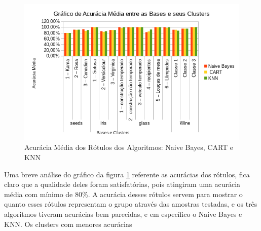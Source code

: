 \begin{figure}[h!]
        \centering
        \includegraphics[scale=0.9]{figs/grafico_acuracia_media_algoritmos.png}
        \caption{Acurácia Média dos Rótulos dos Algoritmos: Naive Bayes, CART e KNN} \label{fig:acuracia_media_algoritmos}
\end{figure}

Uma breve análise do gráfico da figura \ref{fig:acuracia_media_algoritmos} referente as acurácias dos rótulos, fica claro que a qualidade deles foram satisfatórias, pois atingiram uma acurácia média com mínimo de 80\%. A acurácia desses rótulos servem para mostrar o quanto esses rótulos representam o grupo através das amostras testadas, e os três algoritmos tiveram acurácias bem parecidas, e em específico o Naive Bayes e KNN. Os clusters com menores acurácias 


